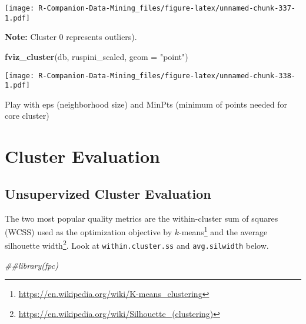 \documentclass[
  notitlepage]{book}
\newenvironment{Shaded}{\begin{snugshade}}{\end{snugshade}}
\newcommand{\CommentTok}[1]{\textcolor[rgb]{0.56,0.35,0.01}{\textit{#1}}}
\newcommand{\DataTypeTok}[1]{\textcolor[rgb]{0.13,0.29,0.53}{#1}}
\newcommand{\ErrorTok}[1]{\textcolor[rgb]{0.64,0.00,0.00}{\textbf{#1}}}
\newcommand{\KeywordTok}[1]{\textcolor[rgb]{0.13,0.29,0.53}{\textbf{#1}}}
\newcommand{\NormalTok}[1]{#1}
\newcommand{\OperatorTok}[1]{\textcolor[rgb]{0.81,0.36,0.00}{\textbf{#1}}}
\newcommand{\StringTok}[1]{\textcolor[rgb]{0.31,0.60,0.02}{#1}}
\DeclareRobustCommand{\href}[2]{#2\footnote{\url{#1}}}
\begin{document}
\begin{Shaded}
\end{Shaded}

\texttt{[image: R-Companion-Data-Mining\_files/figure-latex/unnamed-chunk-337-1.pdf]}

\textbf{Note:} Cluster 0 represents outliers).

\begin{Shaded}
\begin{Highlighting}[]
\KeywordTok{fviz\_cluster}\NormalTok{(db, ruspini\_scaled, }\DataTypeTok{geom =} \StringTok{"point"}\NormalTok{)}
\end{Highlighting}
\end{Shaded}

\texttt{[image: R-Companion-Data-Mining\_files/figure-latex/unnamed-chunk-338-1.pdf]}

Play with eps (neighborhood size) and MinPts (minimum of points needed
for core cluster)

\hypertarget{cluster-evaluation}{%
\section{Cluster Evaluation}\label{cluster-evaluation}}

\hypertarget{unsupervized-cluster-evaluation}{%
\subsection{Unsupervized Cluster Evaluation}\label{unsupervized-cluster-evaluation}}

The two most popular quality metrics are the within-cluster sum of
squares (WCSS) used as the optimization objective by
\href{https://en.wikipedia.org/wiki/K-means_clustering}{\(k\)-means} and the
\href{https://en.wikipedia.org/wiki/Silhouette_(clustering)}{average silhouette
width}. Look at
\texttt{within.cluster.ss} and \texttt{avg.silwidth} below.

\begin{Shaded}
\begin{Highlighting}[]
\CommentTok{\#\#library(fpc)}
\end{Highlighting}
\end{Shaded}
\end{document}

